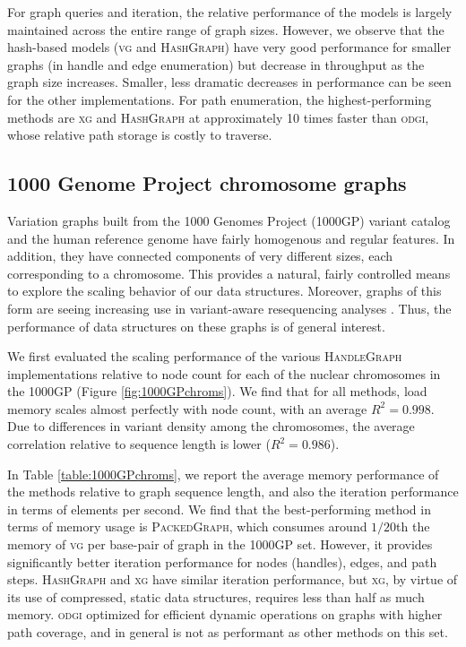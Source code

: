 \documentclass{article}
\begin{document}
For graph queries and iteration, the relative performance of the models is largely maintained across the entire range of graph sizes.
However, we observe that the hash-based models (\textsc{vg} and \textsc{HashGraph}) have very good performance for smaller graphs (in handle and edge enumeration) but decrease in throughput as the graph size increases.
Smaller, less dramatic decreases in performance can be seen for the other implementations.
For path enumeration, the highest-performing methods are \textsc{xg} and \textsc{HashGraph} at approximately 10 times faster than \textsc{odgi}, whose relative path storage is costly to traverse.

\subsection{1000 Genome Project chromosome graphs}

Variation graphs built from the 1000 Genomes Project (1000GP) variant catalog and the human reference genome have fairly homogenous and regular features.
In addition, they have connected components of very different sizes, each corresponding to a chromosome.
This provides a natural, fairly controlled means to explore the scaling behavior of our data structures.
Moreover, graphs of this form are seeing increasing use in variant-aware resequencing analyses \cite{crysnanto2019sequence}.
Thus, the performance of data structures on these graphs is of general interest.

We first evaluated the scaling performance of the various \textsc{HandleGraph} implementations relative to node count for each of the nuclear chromosomes in the 1000GP (Figure \ref{fig:1000GPchroms}).
We find that for all methods, load memory scales almost perfectly with node count, with an average $R^2 = 0.998$.
Due to differences in variant density among the chromosomes, the average correlation relative to sequence length is lower ($R^2 = 0.986$).

In Table \ref{table:1000GPchroms}, we report the average memory performance of the methods relative to graph sequence length, and also the iteration performance in terms of elements per second.
We find that the best-performing method in terms of memory usage is \textsc{PackedGraph}, which consumes around $1/20$th the memory of \textsc{vg} per base-pair of graph in the 1000GP set.
However, it provides significantly better iteration performance for nodes (handles), edges, and path steps.
\textsc{HashGraph} and \textsc{xg} have similar iteration performance, but \textsc{xg}, by virtue of its use of compressed, static data structures, requires less than half as much memory.
\textsc{odgi} optimized for efficient dynamic operations on graphs with higher path coverage, and in general is not as performant as other methods on this set.
\end{document}
